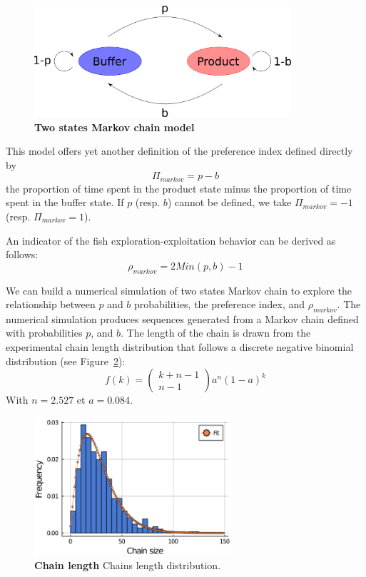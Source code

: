   \begin{figure}[h]
    \centering
    \includegraphics[width=0.85\textwidth]{part_2/assets/model.png}
    \caption{\textbf{Two states Markov chain model}}
    \label{markov_model}
  \end{figure}

  This model offers yet another definition of the preference index defined directly by
  \begin{equation}
    \Pi_{markov} = p - b
  \end{equation}
  \noindent the proportion of time spent in the product state minus the proportion of time spent in the buffer state. If $p$ (resp. $b$) cannot be defined, we take $\Pi_{markov} = -1$ (resp. $\Pi_{markov} = 1$).

 An indicator of the fish exploration-exploitation behavior can be derived as follows:
  \begin{equation}
    \rho_{markov} = 2Min(p,b) - 1
  \end{equation}

  We can build a numerical simulation of two states Markov chain to explore the relationship between $p$ and $b$ probabilities, the preference index, and $\rho_{markov}$. The numerical simulation produces sequences generated from a Markov chain defined with probabilities $p$, and $b$. The length of the chain is drawn from the experimental chain length distribution that follows a discrete negative binomial distribution (see Figure~\ref{chain_fit}):
  \begin{equation}
    f(k) = \begin{pmatrix}
    k+n-1\\
    n-1
    \end{pmatrix}
    a^n(1-a)^k
  \end{equation}
  \noindent With $n=2.527$ et $a=0.084$.

  \begin{figure}[h]
    \centering
    \includegraphics[width=0.65\textwidth]{part_2/assets/chain_fit.png}
    \caption{\textbf{Chain length} Chains length distribution.}
    \label{chain_fit}
  \end{figure}

